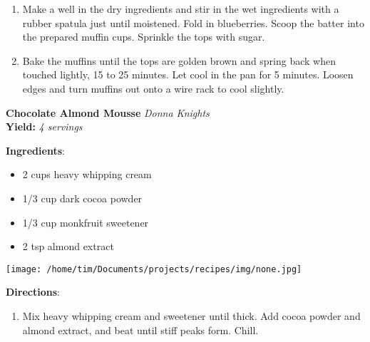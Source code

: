 \documentclass[11pt, twoside, openany]{book}
\begin{document}
\begin{minipage}[t]{\linewidth}
\begin{enumerate}
\item Make a well in the dry ingredients and stir in the wet ingredients with a rubber spatula just until moistened. Fold in blueberries. Scoop the batter into the prepared muffin cups. Sprinkle the tops with sugar.
\item Bake the muffins until the tops are golden brown and spring back when touched lightly, 15 to 25 minutes. Let cool in the pan for 5 minutes. Loosen edges and turn muffins out onto a wire rack to cool slightly.
\end{enumerate}
\end{minipage}\vspace{8mm}
\noindent\begin{minipage}[t]{\linewidth}%
{\Large\textbf{Chocolate Almond Mousse}} \label{chocolate-almond-mousse}\hfill\textit{Donna Knights}\\
\textbf{Yield:} \textit{4 servings}\\
\noindent\begin{minipage}[t]{0.78\linewidth}%
\textbf{Ingredients}:\vspace{-3mm}
\begin{multicols}{2}
\begin{itemize}\setlength\itemsep{-1mm}
\item 2 cups heavy whipping cream
\item 1/3 cup dark cocoa powder
\item 1/3 cup monkfruit sweetener
\item 2 tsp almond extract
\end{itemize}
\end{multicols}
\end{minipage}
\noindent\begin{minipage}[t]{0.18\linewidth}
\centering \strut\vspace*{-\baselineskip}\newline
\texttt{[image: /home/tim/Documents/projects/recipes/img/none.jpg]}\\
\end{minipage}\vspace{3mm}
\textbf{Directions}:
\vspace{-3mm}\begin{enumerate}\setlength\itemsep{-1mm}
\item Mix heavy whipping cream and sweetener until thick. Add cocoa powder and almond extract, and beat until stiff peaks form. Chill.
\end{enumerate}
\end{minipage}\vspace{8mm}
\end{document}
